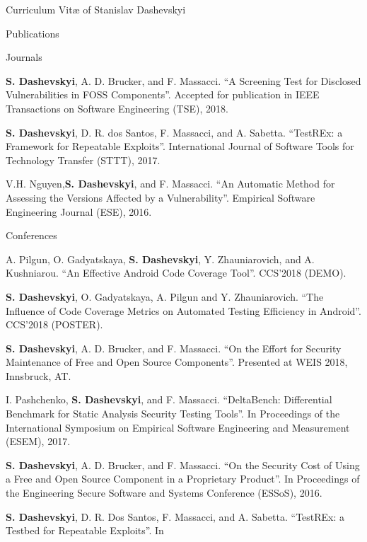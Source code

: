 \documentclass[11pt]{custom-style}
\begin{document}
\begin{cv}{Curriculum Vit\ae{} of Stanislav Dashevskyi}
  \begin{cvlist}{Publications}
  \item[Journals]
    \begin{etaremune}
    \item \textbf{S. Dashevskyi}, A. D. Brucker, and F. Massacci. ``A
      Screening Test for Disclosed Vulnerabilities in FOSS
      Components''. Accepted for publication in IEEE Transactions on
      Software Engineering (TSE), 2018.
    \item \textbf{S. Dashevskyi}, D. R. dos Santos, F. Massacci, and
      A. Sabetta. ``TestREx: a Framework for Repeatable
      Exploits''. International Journal of Software Tools for
      Technology Transfer (STTT), 2017.
    \item V.H. Nguyen,\textbf{S. Dashevskyi}, and F. Massacci. ``An
      Automatic Method for Assessing the Versions Affected by a
      Vulnerability''. Empirical Software Engineering Journal (ESE),
      2016.
    \end{etaremune}
  \item[Conferences]
    \begin{etaremune}
    \item A. Pilgun, O. Gadyatskaya, \textbf{S. Dashevskyi},
      Y. Zhauniarovich, and A. Kushniarou. ``An Effective Android Code
      Coverage Tool''. CCS'2018 (DEMO).
    \item \textbf{S. Dashevskyi}, O. Gadyatskaya, A. Pilgun and
      Y. Zhauniarovich. ``The Influence of Code Coverage Metrics on
      Automated Testing Efficiency in Android''. CCS'2018 (POSTER).
    \item \textbf{S. Dashevskyi}, A. D. Brucker, and F. Massacci. ``On
      the Effort for Security Maintenance of Free and Open Source
      Components''. Presented at WEIS 2018, Innsbruck, AT.
    \item I. Pashchenko, \textbf{S. Dashevskyi}, and
      F. Massacci. ``DeltaBench: Differential Benchmark for Static
      Analysis Security Testing Tools''. In Proceedings of the
      International Symposium on Empirical Software Engineering and
      Measurement (ESEM), 2017.
    \item \textbf{S. Dashevskyi}, A. D. Brucker, and F. Massacci. ``On
      the Security Cost of Using a Free and Open Source Component in a
      Proprietary Product''. In Proceedings of the Engineering Secure
      Software and Systems Conference (ESSoS), 2016.
    \item \textbf{S. Dashevskyi}, D. R. Dos Santos, F. Massacci, and
      A. Sabetta. ``TestREx: a Testbed for Repeatable Exploits''. In

\end{etaremune}
\end{cvlist}
\end{cv}
\end{document}
